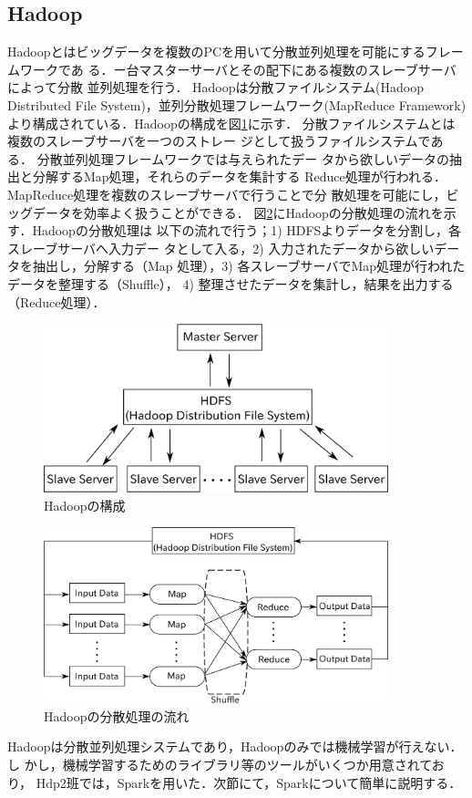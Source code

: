\documentclass[a4paper,12pt]{jarticle}
\begin{document}
\subsection{Hadoop}
Hadoopとはビッグデータを複数のPCを用いて分散並列処理を可能にするフレームワークであ
る．ー台マスターサーバとその配下にある複数のスレーブサーバによって分散
並列処理を行う．
Hadoopは分散ファイルシステム(Hadoop Distributed File
System)，並列分散処理フレームワーク(MapReduce
Framework)より構成されている．Hadoopの構成を図\ref{fig:hadoop}に示す．
分散ファイルシステムとは複数のスレーブサーバを一つのストレー
ジとして扱うファイルシステムである．
分散並列処理フレームワークでは与えられたデー
タから欲しいデータの抽出と分解するMap処理，それらのデータを集計する
Reduce処理が行われる．MapReduce処理を複数のスレーブサーバで行うことで分
散処理を可能にし，ビッグデータを効率よく扱うことができる．
図\ref{fig:MapReduce}にHadoopの分散処理の流れを示す．Hadoopの分散処理は
以下の流れで行う；1) HDFSよりデータを分割し，各スレーブサーバへ入力デー
タとして入る，2) 入力されたデータから欲しいデータを抽出し，分解する（Map
処理），3) 各スレーブサーバでMap処理が行われたデータを整理する（Shuffle），
4) 整理させたデータを集計し，結果を出力する（Reduce処理）．
%
\begin{figure}[htbp]
 \begin{center}
  \includegraphics[width=100mm]{fig/Hadoop.eps}
  \caption{Hadoopの構成}
  \label{fig:hadoop}
 \end{center}
\end{figure}
%
%
\begin{figure}[htbp]
 \begin{center}
  \includegraphics[width=100mm]{fig/MapReduce.eps}
  \caption{Hadoopの分散処理の流れ}
  \label{fig:MapReduce}
 \end{center}
\end{figure}
%
Hadoopは分散並列処理システムであり，Hadoopのみでは機械学習が行えない．し
かし，機械学習するためのライブラリ等のツールがいくつか用意されており，
Hdp2班では，Sparkを用いた．次節にて，Sparkについて簡単に説明する．
\end{document}
